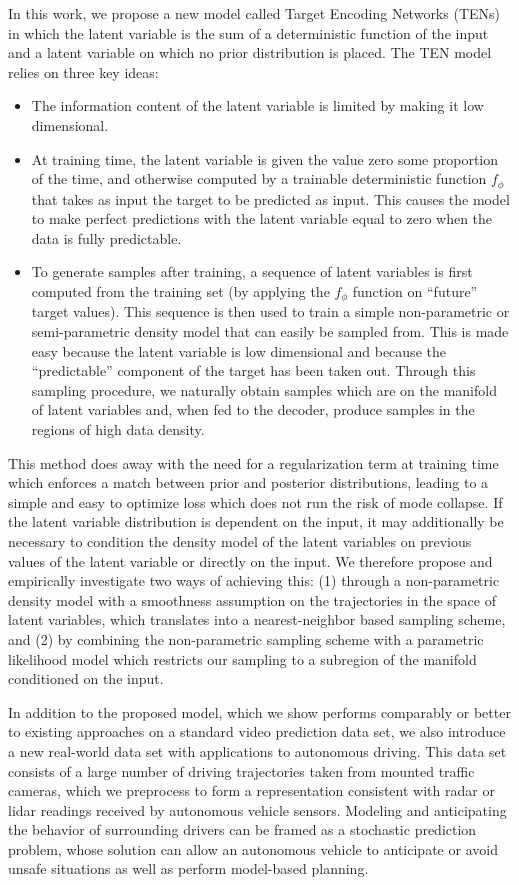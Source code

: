 \documentclass{article}
\begin{document}
In this work, we propose a new model called Target Encoding Networks (TENs) in which the latent variable is the sum of a deterministic function of the input and a latent variable on which no prior distribution is placed.
The TEN model relies on three key ideas:
%
\begin{itemize}
  \item
    The information content of the latent variable is limited by making it low dimensional.
  \item
    At training time, the latent variable is given the value zero some proportion of the time, and otherwise computed by a trainable deterministic function $f_\phi$ that takes as input the target to be predicted as input.
  This causes the model to make perfect predictions with the latent variable equal to zero when the data is fully predictable.
  \item
    To generate samples after training, a sequence of latent variables is first computed from the training set (by applying the $f_\phi$ function on ``future'' target values).
    This sequence is then used to train a simple non-parametric or semi-parametric density model that can easily be sampled from.
    This is made easy because the latent variable is low dimensional and because the ``predictable'' component of the target has been taken out.
    Through this sampling procedure, we naturally obtain samples which are on the manifold of latent variables and, when fed to the decoder, produce samples in the regions of high data density.
\end{itemize}

This method does away with the need for a regularization term at training time which enforces a match between prior and posterior distributions, leading to a simple and easy to optimize loss which does not run the risk of mode collapse.
If the latent variable distribution is dependent on the input, it may additionally be necessary to condition the density model of the latent variables on previous values of the latent variable or directly on the input.
We therefore propose and empirically investigate two ways of achieving this:
(1) through a non-parametric density model with a smoothness assumption on the trajectories in the space of latent variables, which translates into a nearest-neighbor based sampling scheme, and
(2) by combining the non-parametric sampling scheme with a parametric likelihood model which restricts our sampling to a subregion of the manifold conditioned on the input.

In addition to the proposed model, which we show performs comparably or better to existing approaches on a standard video prediction data set, we also introduce a new real-world data set with applications to autonomous driving.
This data set consists of a large number of driving trajectories taken from mounted traffic cameras, which we preprocess to form a representation consistent with radar or lidar readings received by autonomous vehicle sensors.
Modeling and anticipating the behavior of surrounding drivers can be framed as a stochastic prediction problem, whose solution can allow an autonomous vehicle to anticipate or avoid unsafe situations as well as perform model-based planning.
\end{document}
